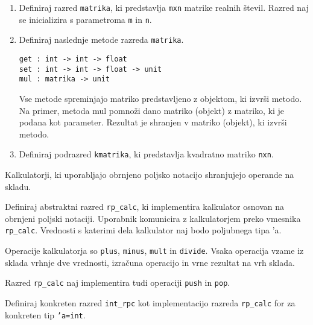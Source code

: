 \begin{ex}
\begin{enumerate}[label=(\Alph*)]
\item Definiraj razred \lstinline{matrika}, ki predstavlja \texttt{mxn} matrike realnih \v stevil. Razred naj se inicializira s parametroma \texttt{m} in \texttt{n}.

\item Definiraj naslednje metode razreda \lstinline{matrika}.
\begin{lstlisting}
get : int -> int -> float
set : int -> int -> float -> unit
mul : matrika -> unit
\end{lstlisting}

Vse metode spreminjajo matriko predstavljeno z objektom, ki izvr\v si metodo.  Na primer, metoda mul pomno\v zi dano matriko (objekt) z matriko, ki je podana kot parameter. Rezultat je shranjen v matriko (objekt), ki izvr\v si metodo.

\item Definiraj podrazred \lstinline{kmatrika}, ki predstavlja kvadratno matriko \texttt{nxn}.
\end{enumerate}
\end{ex} 



\begin{ex}
Kalkulatorji, ki uporabljajo obrnjeno poljsko notacijo shranjujejo operande na skladu.

Definiraj abstraktni razred \lstinline{rp_calc}, ki implementira kalkulator osnovan na obrnjeni poljski notaciji. Uporabnik komunicira z kalkulatorjem preko vmesnika \lstinline{rp_calc}. Vrednosti s katerimi dela kalkulator naj bodo poljubnega tipa 'a. 

Operacije kalkulatorja so \texttt{plus}, \texttt{minus}, \texttt{mult} in \texttt{divide}. Vsaka operacija vzame iz sklada vrhnje dve vrednosti, izra\v cuna operacijo in vrne rezultat na vrh sklada.

Razred \lstinline{rp_calc} naj implementira tudi operaciji \texttt{push} in \texttt{pop}. 

Definiraj konkreten razred \lstinline{int_rpc} kot implementacijo razreda \lstinline{rp_calc} for za konkreten tip \texttt{'a=int}.
\end{ex} 





%
%
%       
%




